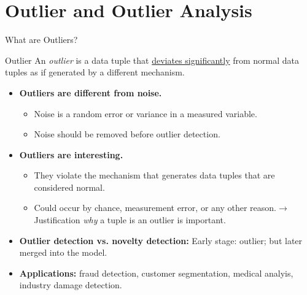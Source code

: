 \section{Outlier and Outlier Analysis}


\begin{frame}{What are Outliers?}
	\begin{block}{Outlier}
		An \textit{outlier} is a data tuple that \underline{deviates significantly} from normal data tuples as if generated by a different mechanism.
	\end{block}

	\begin{itemize}
		\item \textbf{Outliers are \textcolor{faugray}{different from noise}.}
		      \begin{itemize}
			      \item Noise is a random error or variance in a measured variable.
			      \item Noise should be removed before outlier detection.
		      \end{itemize}
		\item \textbf{Outliers are \textcolor{faugray}{interesting}.}
		      \begin{itemize}
			      \item They violate the mechanism that generates data tuples that are considered normal.
			      \item Could occur by chance, measurement error, or any other reason.\newline $\rightarrow$ Justification \textit{why} a tuple is an outlier is important.
		      \end{itemize}
		\item \textbf{Outlier detection vs. novelty detection:} Early stage: outlier; but later merged into the model.
		\item \textbf{Applications:} fraud detection, customer segmentation, medical analyis, industry damage detection.
	\end{itemize}

\end{frame}

